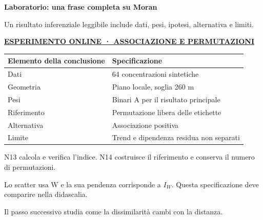 \documentclass[12pt,aspectratio=1610]{beamer}
\newcommand{\PBody}[1]{\par{\fontsize{11.3}{14.8}\selectfont #1\par}}
\newcommand{\PSmall}[1]{\par{\fontsize{9.8}{13.1}\selectfont #1\par}}
\newcommand{\PInfo}[1]{%
\begin{tcolorbox}[enhanced,arc=1.6mm,boxrule=.55pt,colback=GeoTint,
 colframe=Rule!80!Classical,left=2.3mm,right=2.3mm,top=2mm,bottom=2mm,
 before skip=1mm,after skip=1mm]
\PSmall{#1}\end{tcolorbox}}
\newcommand{\PLab}[2]{\par{\color{Classical}\bfseries\fontsize{9}{11}\selectfont
\href{#1}{\MakeUppercase{#2}}}\par\vspace{1.8mm}}
\begin{document}
\begin{frame}[plain]\hypertarget{slide70}{}
\begin{lrbox}{\TitleBox}
\begin{minipage}[t]{17.7cm}\raggedright\color{Ink}\fontsize{11.3}{14.8}\selectfont
\color{Navy}\bfseries\fontsize{20.6}{24.5}\selectfont Laboratorio: una frase completa su Moran
\end{minipage}\end{lrbox}

\begin{lrbox}{\RecallBox}
\begin{minipage}[t]{14.3cm}\raggedright\color{Ink}\fontsize{11.3}{14.8}\selectfont
\fontsize{10.3}{13.8}\selectfont Un risultato inferenziale leggibile include dati, pesi, ipotesi, alternativa e limiti.
\end{minipage}\end{lrbox}

\begin{lrbox}{\PilotLeftBox}
\begin{minipage}[t]{10.05cm}\raggedright\color{Ink}\fontsize{11.3}{14.8}\selectfont
\PLab{https://marzione00.github.io/Lab_Geo/\#laboratorio/m11-moran}{Esperimento online · associazione e permutazioni}
{\fontsize{10.2}{13.1}\selectfont\renewcommand{\arraystretch}{1.45}\begin{tabular}{@{}p{3.1cm}p{5.9cm}@{}}\toprule
\textbf{Elemento della conclusione} & \textbf{Specificazione}\\\midrule
Dati & 64 concentrazioni sintetiche\\
Geometria & Piano locale, soglia 260 m\\
Pesi & Binari A per il risultato principale\\
Riferimento & Permutazione libera delle etichette\\
Alternativa & Associazione positiva\\
Limite & Trend e dipendenza residua non separati\\
\bottomrule\end{tabular}}

\end{minipage}\end{lrbox}

\begin{lrbox}{\PilotRightBox}
\begin{minipage}[t]{7.55cm}\raggedright\color{Ink}\fontsize{11.3}{14.8}\selectfont
\PBody{N13 calcola e verifica l’indice. N14 costruisce il riferimento e conserva il numero di permutazioni.}
\vspace{2.5mm}
\PInfo{Lo scatter usa W e la sua pendenza corrisponde a $I_W$. Questa specificazione deve comparire nella didascalia.}
\PBody{Il passo successivo studia come la dissimilarità cambi con la distanza.}
\vspace{2.5mm}


\end{minipage}
\end{lrbox}
\end{frame}
\end{document}
